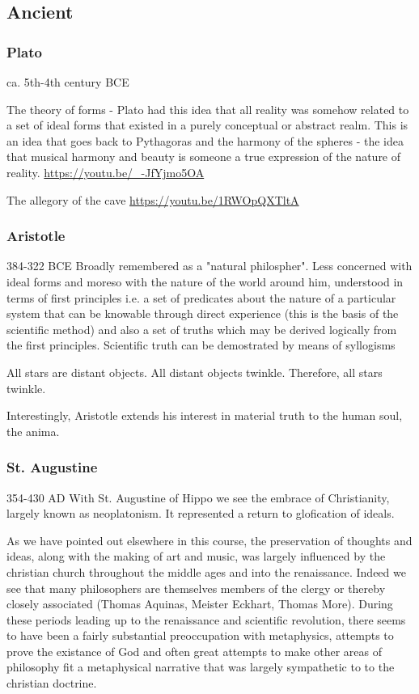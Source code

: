 \documentclass[11pt]{article}
\begin{document}
\subsection{Ancient}
\label{sec:orgc570835}
\subsubsection{Plato}
\label{sec:org5e99445}
ca. 5th-4th century BCE

The theory of forms - Plato had this idea that all reality was somehow
related to a set of ideal forms that existed in a purely conceptual or
abstract realm. This is an idea that goes back to Pythagoras and the
harmony of the spheres - the idea that musical harmony and beauty is
someone a true expression of the nature of reality.
\url{https://youtu.be/\_-JfYjmo5OA}

The allegory of the cave
\url{https://youtu.be/1RWOpQXTltA}


\subsubsection{Aristotle}
\label{sec:orgac71d5b}
384-322 BCE
Broadly remembered as a "natural philospher". Less concerned with
ideal forms and moreso with the nature of the world around him,
understood in terms of first principles i.e. a set of predicates
about the nature of a particular system that can be knowable through
direct experience (this is the basis of the scientific method) and
also a set of truths which may be derived logically from the first
principles. Scientific truth can be demostrated by means of syllogisms

All stars are distant objects.
All distant objects twinkle.
Therefore, all stars twinkle.

Interestingly, Aristotle extends his interest in material truth to the
human soul, the anima. 

\subsubsection{St. Augustine}
\label{sec:org1841c4a}
354-430 AD
With St. Augustine of Hippo we see the embrace of Christianity,
largely known as neoplatonism. It represented a return to glofication
of ideals.

As we have pointed out elsewhere in this course, the preservation of
thoughts and ideas, along with the making of art and music, was
largely influenced by the christian church throughout the middle
ages and into the renaissance. Indeed we see that many philosophers
are themselves members of the clergy or thereby closely associated 
(Thomas Aquinas, Meister Eckhart, Thomas More). During these periods
leading up to the renaissance and scientific revolution, there seems
to have been a fairly substantial preoccupation with metaphysics,
attempts to prove the existance of God and often great attempts to
make other areas of philosophy fit a metaphysical narrative that was
largely sympathetic to to the christian doctrine.     
\end{document}
